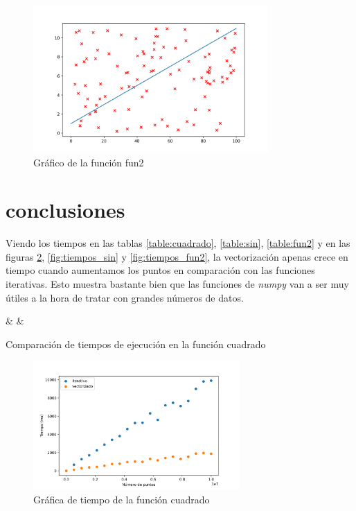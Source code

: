 \documentclass[6pt]{AiTex}
\begin{document}
\begin{figure}[H]
    \centering
    \includegraphics[width=0.8\textwidth]{./imagenes/fun2.png}
    \caption{Gráfico de la función fun2}
    \label{fig:fun_fun2}
\end{figure}

\section{conclusiones}

Viendo los tiempos en las tablas \ref{table:cuadrado}, \ref{table:sin}, \ref{table:fun2} y en las figuras \ref{fig:tiempos_cuadrado}, \ref{fig:tiempos_sin} y \ref{fig:tiempos_fun2}, la vectorización apenas crece en tiempo cuando aumentamos los puntos en comparación con las funciones iterativas. Esto muestra bastante bien que las funciones de \textit{numpy} van a ser muy útiles a la hora de tratar con grandes números de datos.

\begin{table}[H]
    \centering
    {\casos & \iterativo & \vectorizado}
    \caption{Comparación de tiempos de ejecución en la función cuadrado}
    \label{table:cuadrado}
\end{table}

\begin{figure}[H]
    \centering
    \includegraphics[width=0.7\textwidth]{./imagenes/tiempos_cuadrado.png}
    \caption{Gráfica de tiempo de la función cuadrado}
    \label{fig:tiempos_cuadrado}
\end{figure}
\end{document}
